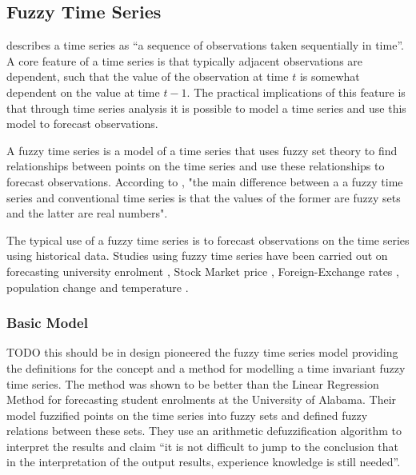 \documentclass{article}
\theoremstyle{definition}
\begin{document}
\subsection{Fuzzy Time Series}

\cite{box2013time} describes a time series as ``a sequence of observations taken sequentially in time''. A core feature of a time series is that typically adjacent observations are dependent, such that the value of the observation at time $t$ is somewhat dependent on the value at time $t-1$. The practical implications of this feature is that through time series analysis it is possible to model a time series and use this model to forecast observations.

A fuzzy time series is a model of a time series that uses fuzzy set theory to find relationships between points on the time series and use these relationships to forecast observations. According to \cite{chen1996forecasting}, "the main difference between a a fuzzy time series and conventional time series is that the values of the former are fuzzy sets and the latter are real numbers".

The typical use of a fuzzy time series is to forecast observations on the time series using historical data. Studies using fuzzy time series have been carried out on forecasting university enrolment \citep{song1993forecasting, song1994forecasting, chen1996forecasting, tsai2000forecasting, chen2004new, cheng2006trend, lee2006pattern, huarng2006ratio, tsaur2012fuzzy}, Stock Market price \citep{huarng2005type, cheng2006trend, lee2006pattern, huarng2006ratio, Chen2007fib, chu2009fuzzy}, Foreign-Exchange rates \citep{tsaur2012fuzzy}, population change \citep{tsai1999study} and temperature \citep{temperatureprediction2000, lee2006pattern}. 

\subsubsection{Basic Model}
\label{basic}
TODO this should be in design
\cite{song1993forecasting} pioneered the fuzzy time series model providing the definitions for the concept and a method for modelling a time invariant fuzzy time series. The method was shown to be better than the Linear Regression Method for forecasting student enrolments at the University of Alabama. Their model fuzzified points on the time series into fuzzy sets and defined fuzzy relations between these sets. They use an arithmetic defuzzification algorithm to interpret the results and claim ``it is not difficult to jump to the conclusion that in the interpretation of the output results, experience knowledge is still needed''.
 
\end{document}
